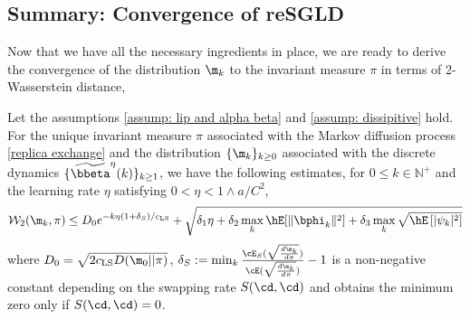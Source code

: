 \subsection{Summary: Convergence of reSGLD}

Now that we have all the necessary ingredients in place, we are ready to derive the convergence of the distribution $\m_{k}$ to the invariant measure $\pi$ in terms of 2-Wasserstein distance, 




\begin{theorem}Let the assumptions \eqref{assump: lip and alpha beta} and \eqref{assump: dissipitive} hold. For the unique invariant measure $\pi$ associated with the Markov diffusion process \eqref{replica exchange} and the distribution $\{\m_{k}\}_{k\ge 0}$ associated with the discrete dynamics $\{\widetilde \bbeta^{\eta}(k)\}_{k\ge 1}$, we have the following estimates, for $0\le k\in \mathbb N^{+}$ and the learning rate $\eta$ satisfying $0<\eta<1 \land a/C^2$, 
\begin{equation}
    \mathcal{W}_2(\m_{k}, \pi) \le  D_0 e^{-k\eta(1+\delta_S)/c_{\text{LS}}}+\sqrt{\delta_1 \eta +  \delta_2 \max_{k}\hE[\|\bphi_k\|^2]+ \delta_3\max_{k}\sqrt{\hE\left[|\psi_{k}|^2\right]}}
\end{equation}
where $D_0=\sqrt{2c_{\text{LS}}D(\m_0||\pi)}$, $\delta_{S}:=\min_{k}\frac{\cE_S(\sqrt{\frac{d\m_k}{d\pi}})}{\cE(\sqrt{\frac{d\m_k}{d\pi}})}-1$ is a non-negative constant depending on the swapping rate $S(\cd, \cd)$ and obtains the minimum zero only if $S(\cd, \cd)=0$.
\end{theorem}{}

